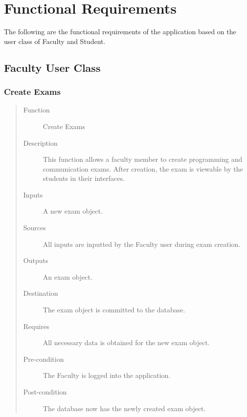 %
%

\section{Functional Requirements}
The following are the functional requirements of the application based on the
user class of Faculty and Student.
\subsection{Faculty User Class}
\subsubsection{Create Exams} 
\begin{quote} %
\begin{description}
\item[Function]
   Create Exams
\item[Description]
   This function allows a faculty member to create programming and communication
   exams. After creation, the exam is viewable by the students in their
   interfaces.
\item[Inputs]
   A new exam object.
\item[Sources]
   All inputs are inputted by the Faculty user during exam creation.
\item[Outputs]
   An exam object.
\item[Destination]
   The exam object is committed to the database.
\item[Requires]
   All necessary data is obtained for the new exam object.
\item[Pre-condition]
   The Faculty is logged into the application.
\item[Post-condition]
   The database now has the newly created exam object.
\end{description}
\end{quote} %

